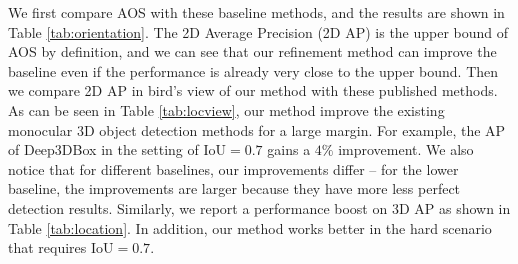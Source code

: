 \documentclass[runningheads]{llncs}
\begin{document}
We first compare AOS with these baseline methods, and the results are shown in Table \ref{tab:orientation}. The 2D Average Precision (2D AP) is the upper bound of AOS by definition, and we can see that our refinement method can improve the baseline even if the performance is already very close to the upper bound. Then we compare 2D AP in bird's view of our method with these published methods. As can be seen in Table \ref{tab:locview}, our method improve the existing monocular 3D object detection methods for a large margin. For example, the AP of Deep3DBox in the setting of $\mathrm{IoU}=0.7$ gains a $4\%$ improvement. We also notice that for different baselines, our improvements differ -- for the lower baseline, the improvements are larger because they have more less perfect detection results. Similarly, we report a performance boost on 3D AP as shown in Table \ref{tab:location}. In addition, our method works better in the hard scenario that requires $\mathrm{IoU}=0.7$. 
\end{document}
